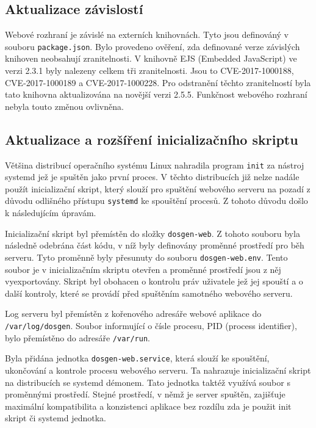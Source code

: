 \subsection{Aktualizace závislostí}
Webové rozhraní je závislé na externích knihovnách. Tyto jsou definováný v souboru \texttt{package.json}. Bylo provedeno ověření, zda definované verze závislých knihoven neobsahují zranitelnosti. V knihovně EJS (Embedded JavaScript) ve verzi 2.3.1 byly nalezeny celkem tři zranitelnosti. Jsou to CVE-2017-1000188, CVE-2017-1000189 a CVE-2017-1000228. Pro odstranění těchto zranitelností byla tato knihovna aktualizována na novější verzi 2.5.5. Funkčnost webového rozhraní nebyla touto změnou ovlivněna.

\subsection{Aktualizace a rozšíření inicializačního skriptu}
Většina distribucí operačního systému Linux nahradila program \texttt{init} za nástroj systemd jež je spuštěn jako první proces. V těchto distribucích již nelze nadále použít inicializační skript, který slouží pro spuštění webového serveru na pozadí z důvodu odlišného přístupu \texttt{systemd} ke spouštění procesů. Z tohoto důvodu došlo k následujícím úpravám.

Inicializační skript byl přemístěn do složky \texttt{dosgen-web}. Z tohoto souboru byla následně odebrána část kódu, v níž byly definovány proměnné prostředí pro běh serveru. Tyto proměnně byly přesunuty do souboru \texttt{dosgen-web.env}. Tento soubor je v inicializačním skriptu otevřen a proměnné prostředí jsou z něj vyexportovány. Skript byl obohacen o kontrolu práv uživatele jež jej spouští a o další kontroly, které se provádí před spuštěním samotného webového serveru.

Log serveru byl přemístěn z kořenového adresáře webové aplikace do \newline \texttt{/var/log/dosgen}. Soubor informující o čísle procesu, PID (process identifier), bylo přemístěno do adresáře \texttt{/var/run}.

Byla přidána jednotka \texttt{dosgen-web.service}, která slouží ke spouštění, ukončování a kontrole procesu webového serveru. Ta nahrazuje inicializační skript na distribucích se systemd démonem. Tato jednotka taktéž využívá soubor s proměnnými prostředí. Stejné prostředí, v němž je server spuštěn, zajišťuje maximální kompatibilita a konzistenci aplikace bez rozdílu zda je použit init skript či systemd jednotka.

